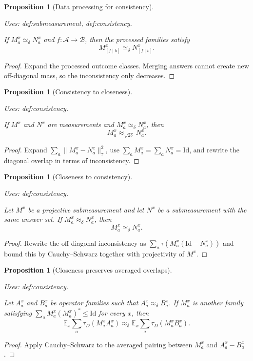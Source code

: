 \documentclass{article}
\providecommand{\uses}[1]{\par\smallskip\noindent\emph{Uses:} #1.\par\smallskip}
\newtheorem{proposition}[definition]{Proposition}
\theoremstyle{remark}
\newcommand{\E}{\mathbb{E}}
\newcommand{\id}{\mathrm{Id}}
\begin{document}
\begin{proposition}[Data processing for consistency]\label{lem:data-processing}
  \uses{def:submeasurement, def:consistency}
  If $M^x_a\simeq_\delta N^x_a$ and $f\colon \mathcal A\to \mathcal B$, then the processed families satisfy
  \[
    M^x_{[f\mid b]}\simeq_\delta N^x_{[f\mid b]}.
  \]
\end{proposition}
\begin{proof}
  Expand the processed outcome classes. Merging answers cannot create new off-diagonal mass, so the inconsistency only decreases.
\end{proof}

\begin{proposition}[Consistency to closeness]\label{lem:consistency-consequences}
  \uses{def:consistency}
  If $M^x$ and $N^x$ are measurements and $M^x_a\simeq_\delta N^x_a$, then
  \[
    M^x_a\approx_{\sqrt{2\delta}} N^x_a.
  \]
\end{proposition}
\begin{proof}
  Expand $\sum_a\|M^x_a-N^x_a\|_\tau^2$, use $\sum_a M^x_a=\sum_a N^x_a=\id$, and rewrite the diagonal overlap in terms of inconsistency.
\end{proof}

\begin{proposition}[Closeness to consistency]\label{lem:closeness-to-consistency}
  \uses{def:consistency}
  Let $M^x$ be a projective submeasurement and let $N^x$ be a submeasurement with the same answer set. If $M^x_a\approx_\delta N^x_a$, then
  \[
    M^x_a\simeq_\delta N^x_a.
  \]
\end{proposition}
\begin{proof}
  Rewrite the off-diagonal inconsistency as $\sum_a \tau(M^x_a(\id-N^x_a))$ and bound this by Cauchy--Schwarz together with projectivity of $M^x$.
\end{proof}

\begin{proposition}[Closeness preserves averaged overlaps]\label{lem:closeness-to-close-ips}
  \uses{def:consistency}
  Let $A^x_a$ and $B^x_a$ be operator families such that $A^x_a\approx_\delta B^x_a$. If $M^x_a$ is another family satisfying $\sum_a M^x_a(M^x_a)^*\le \id$ for every $x$, then
  \[
    \E_x\sum_a \tau_D(M^x_aA^x_a)
    \approx_\delta
    \E_x\sum_a \tau_D(M^x_aB^x_a).
  \]
\end{proposition}
\begin{proof}
  Apply Cauchy--Schwarz to the averaged pairing between $M^x_a$ and $A^x_a-B^x_a$.
\end{proof}
\end{document}
